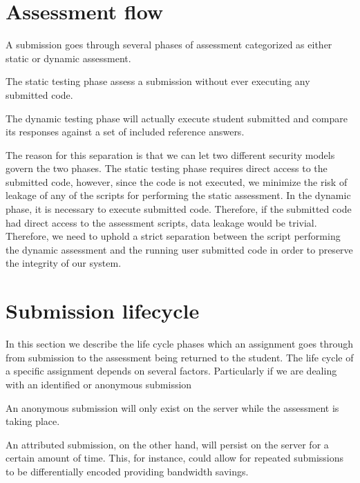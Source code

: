 


\section{Assessment flow}
A submission goes through several phases of assessment categorized as
either static or dynamic assessment.

The static testing phase assess a submission without ever executing
any submitted code.

The dynamic testing phase will actually execute student submitted and
compare its responses against a set of included reference answers.

The reason for this separation is that we can let two different security
models govern the two phases. The static testing phase requires direct
access to the submitted code, however, since the code is not executed,
we minimize the risk of leakage of any of the scripts for performing
the static assessment. In the dynamic phase, it is necessary to
execute submitted code. Therefore, if the submitted code had direct
access to the assessment scripts, data leakage would be
trivial. Therefore, we need to uphold a strict separation between the
script performing the dynamic assessment and the running user submitted code in
order to preserve the integrity of our system.

\section{Submission lifecycle}
In this section we describe the life cycle phases which an assignment
goes through from submission to the assessment being returned to the
student. The life cycle of a specific assignment depends on several
factors. Particularly if we are dealing with an identified or
anonymous submission

An anonymous submission will only exist on the server while the
assessment is taking place.

An attributed submission, on the other hand, will persist on the
server for a certain amount of time. This, for instance, could allow
for repeated submissions to be differentially encoded providing
bandwidth savings.


